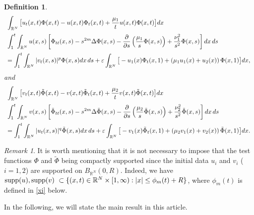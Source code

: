 \documentclass[12pt,leqno]{amsart}
\numberwithin{equation}{section}
\newtheorem{Def}[theo]{Definition}
\theoremstyle{remark}
\newtheorem{rem}{Remark}[section]
\def\R{{\mathbb{R}}}
\def\d{\displaystyle}
\def\e{{\varepsilon}}
\begin{document}
\begin{Def}
\begin{equation}
\begin{array}{l}\label{energysol2-2}
\d \int_{\R^N}\big[u_t(x,t)\Phi(x,t)- u(x,t)\Phi_t(x,t)+\frac{\mu_1}{t}u(x,t) \Phi(x,t)\big] dx \vspace{.2cm}\\
\d \int_1^t  \int_{\R^N}u(x,s)\left[\Phi_{tt}(x,s)-s^{2m}\Delta \Phi(x,s) -\frac{\partial}{\partial s}\left(\frac{\mu_1}{s}\Phi(x,s)\right)+\frac{\nu^2_1}{s^2}\Phi(x,s)  \right]dx \,ds\vspace{.2cm}\\
\d =\int_{1}^{t}\int_{\R^N}|v_t(x,s)|^p\Phi(x,s)dx \, ds + \e \int_{\R^N}\big[-u_1(x)\Phi_t(x,1)+\left(\mu_1 u_1(x)+u_2(x)\right)\Phi(x,1)\big]dx,
\end{array}
\end{equation}
and
\begin{equation}
\begin{array}{l}\label{energysol3-2}
\d \int_{\R^N}\big[v_t(x,t)\tilde{\Phi}(x,t)- v(x,t)\tilde{\Phi}_t(x,t)+\frac{\mu_2}{t}v(x,t) \tilde{\Phi}(x,t)\big] dx \vspace{.2cm}\\
\d \int_1^t  \int_{\R^N}v(x,s)\left[\tilde{\Phi}_{tt}(x,s)-s^{2m}\Delta \tilde{\Phi}(x,s) -\frac{\partial}{\partial s}\left(\frac{\mu_2}{s}\tilde{\Phi}(x,s)\right)+\frac{\nu^2_2}{s^2}\tilde{\Phi}(x,s)  \right]dx \,ds\vspace{.2cm}\\
\d =\int_{1}^{t}\int_{\R^N}|u_t(x,s)|^q\tilde{\Phi}(x,s)dx \, ds + \e \int_{\R^N}\big[-v_1(x)\tilde{\Phi}_t(x,1)+\left(\mu_2 v_1(x)+v_2(x)\right)\tilde{\Phi}(x,1)\big]dx.
\end{array}
\end{equation}
\end{Def}

\begin{rem}\label{rem-supp}
It is worth mentioning that it is not necessary to impose that the  test functions $\Phi$ and  $\tilde{\Phi}$ being compactly supported since the initial data $u_i$ and $v_i$ ($i=1,2$) are supported on $B_{\R^N}(0,R)$. Indeed, we have $\mbox{\rm supp}(u), \mbox{\rm supp}(v)\ \subset\{(x,t)\in\R^N\times[1,\infty): |x|\le \phi_m(t)+R\}$, where $\phi_m(t)$ is defined in \eqref{xi} below.
\end{rem}







In the following, we will state the main result in this article.
\end{document}
